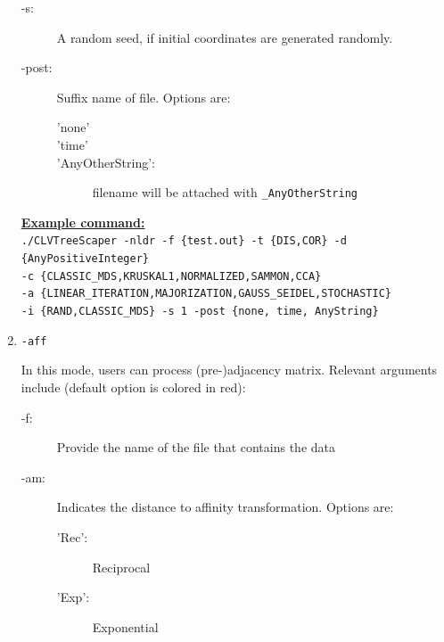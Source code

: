 \documentclass[11pt]{article}
\begin{document}
\begin{enumerate}[{\bf (1)}]
\begin{description}
	
	\item[-s:] A random seed, if initial coordinates are generated randomly.
	
	\item[-post:] Suffix name of file. Options are:
		\begin{description}
			\item['none'] 
			\item['time']
			\item['AnyOtherString':] filename will be attached with {\tt \_AnyOtherString}  
		\end{description}

	\end{description}

\vspace{0.5 cm}	
	
\ul{\bf Example command:}\\
{\tt ./CLVTreeScaper -nldr -f \{test.out\} -t \{DIS,COR\} -d \{AnyPositiveInteger\} }\\
{\tt -c \{CLASSIC\_MDS,KRUSKAL1,NORMALIZED,SAMMON,CCA\} }\\
{\tt -a \{LINEAR\_ITERATION,MAJORIZATION,GAUSS\_SEIDEL,STOCHASTIC\} }\\
{\tt -i \{RAND,CLASSIC\_MDS\} -s 1 -post \{none, time, AnyString\}}\\

\item {\tt -aff}

In this mode, users can process (pre-)adjacency matrix. Relevant arguments include (default option is colored in red):
\begin{description}
	\item[-f:] Provide the name of the file that contains the data

	\item[-am:] Indicates the distance to affinity transformation. Options are:
	\begin{description}
		\item['Rec':] Reciprocal
		\item['Exp':] Exponential
	\end{description}


\end{description}
\end{enumerate}
\end{document}
